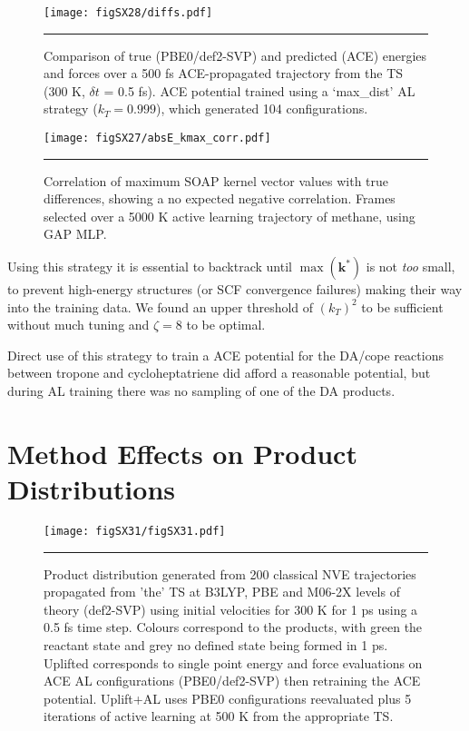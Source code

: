 \documentclass[11pt]{article}
\numberwithin{equation}{subsection}
\begin{document}
\begin{figure}[h!]
	\centering
	\texttt{[image: figSX28/diffs.pdf]}
	\vspace{0.1cm}
	\hrule
	\vspace{0.1cm}
	\caption{Comparison of true (PBE0/def2-SVP) and predicted (ACE) energies and forces over a 500 fs ACE-propagated trajectory from the TS (300 K, $\delta t$ = 0.5 fs). ACE potential trained using a `max\_dist' AL strategy ($k_T = 0.999$), which generated 104 configurations.}
	\label{fig::SX28}
\end{figure}



\begin{figure}[h!]
	\centering
	\texttt{[image: figSX27/absE\_kmax\_corr.pdf]}
	\vspace{0.1cm}
	\hrule
	\vspace{0.1cm}
	\caption{Correlation of maximum SOAP kernel vector values with true differences, showing a no expected negative correlation. Frames selected over a 5000 K active learning trajectory of methane, using GAP MLP.}
	\label{fig::SX27}
\end{figure}



Using this strategy it is essential to backtrack until $\max(\boldsymbol{k}^*)$ is not \emph{too} small, to prevent high-energy structures (or SCF convergence failures) making their way into the training data. We found an upper threshold of $(k_T)^2$ to be sufficient without much tuning and $\zeta = 8$ to be optimal.


Direct use of this strategy to train a ACE potential for the DA/cope reactions between tropone and cycloheptatriene did afford a reasonable potential, but during AL training there was no sampling of one of the DA products.








\newpage
\section{Method Effects on Product Distributions}


\begin{figure}[h!]
	\centering
	\vspace{0.4cm}
	\texttt{[image: figSX31/figSX31.pdf]}
	\vspace{0.1cm}
	\hrule
	\vspace{0.1cm}
	\caption{Product distribution generated from 200 classical NVE trajectories propagated from 'the' TS at B3LYP, PBE and M06-2X levels of theory (def2-SVP) using initial velocities for 300 K for 1 ps using a 0.5 fs time step. Colours correspond to the products, with green the reactant state and grey no defined state being formed in 1 ps. Uplifted corresponds to single point energy and force evaluations on ACE AL configurations (PBE0/def2-SVP) then retraining the ACE potential. Uplift+AL uses PBE0 configurations reevaluated plus 5 iterations of active learning at 500 K from the appropriate TS.
}
	\label{fig::SX31}
\end{figure}




\clearpage
\printbibliography
\end{document}
